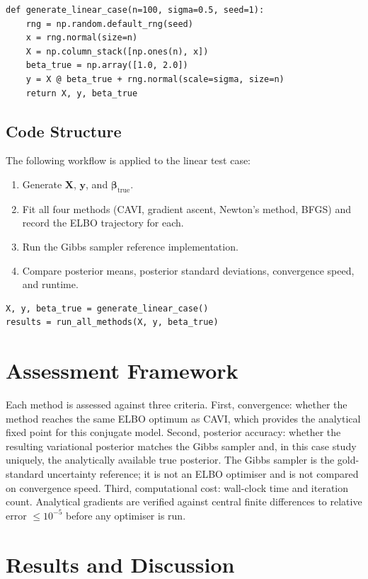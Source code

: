 \documentclass[11pt,a4paper]{article}
\begin{document}
\begin{verbatim}
def generate_linear_case(n=100, sigma=0.5, seed=1):
    rng = np.random.default_rng(seed)
    x = rng.normal(size=n)
    X = np.column_stack([np.ones(n), x])
    beta_true = np.array([1.0, 2.0])
    y = X @ beta_true + rng.normal(scale=sigma, size=n)
    return X, y, beta_true
\end{verbatim}

\subsection{Code Structure}

The following workflow is applied to the linear test case:
\begin{enumerate}
\item Generate $\bm{X}$, $\bm{y}$, and $\bm{\beta}_{\mathrm{true}}$.
\item Fit all four methods (CAVI, gradient ascent, Newton's method, BFGS) and record the ELBO trajectory for each.
\item Run the Gibbs sampler reference implementation.
\item Compare posterior means, posterior standard deviations, convergence speed, and runtime.
\end{enumerate}

\begin{verbatim}
X, y, beta_true = generate_linear_case()
results = run_all_methods(X, y, beta_true)
\end{verbatim}

\section{Assessment Framework}

Each method is assessed against three criteria. First, convergence: whether the method reaches the same ELBO optimum as CAVI, which provides the analytical fixed point for this conjugate model. Second, posterior accuracy: whether the resulting variational posterior matches the Gibbs sampler and, in this case study uniquely, the analytically available true posterior. The Gibbs sampler is the gold-standard uncertainty reference; it is not an ELBO optimiser and is not compared on convergence speed. Third, computational cost: wall-clock time and iteration count. Analytical gradients are verified against central finite differences to relative error $\leq 10^{-5}$ before any optimiser is run.

\section{Results and Discussion}
\label{sec:results}
\end{document}
